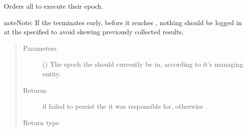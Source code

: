 \documentclass[letterpaper,10pt,english]{sphinxmanual}
\begin{document}
\begin{fulllineitems}

\begin{fulllineitems}
\label{\detokenize{app.domain:app.domain.cluster_groups.SGClusterExt.execute_epoch}}
Orders all  to execute their epoch.

\begin{sphinxadmonition}{note}{Note:}
If the  terminates early, before it reaches
{\hyperref[\detokenize{app.domain:app.domain.master_servers.Master.MAX_EPOCHS}]{}},
nothing should be logged in
{\hyperref[\detokenize{app.domain.helpers:app.domain.helpers.smart_dataclasses.LoggingData}]{}}
at the specified  to avoid skewing previously
collected results.
\end{sphinxadmonition}
\begin{quote}\begin{description}
\item[{Parameters}] \leavevmode
{} () \textendash{} The epoch the  should currently be in, according
to it’s managing  entity.

\item[{Returns}] \leavevmode
{} if  failed to persist the  it
was responsible for, otherwise .

\item[{Return type}] \leavevmode
{}

\end{description}\end{quote}

\end{fulllineitems}



\end{fulllineitems}
\end{document}
